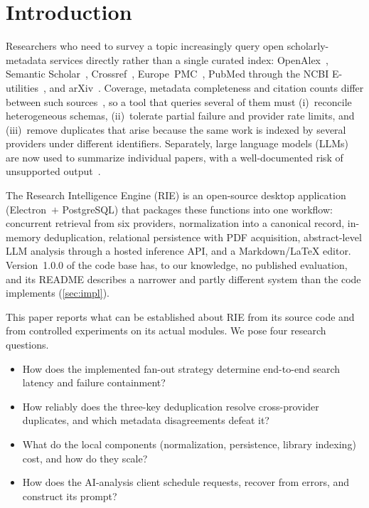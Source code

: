 \documentclass[conference]{IEEEtran}
\newcommand{\RIE}{RIE}
\begin{document}
\section{Introduction}
\label{sec:intro}

Researchers who need to survey a topic increasingly query open scholarly-metadata services directly rather than a single curated index: OpenAlex~\cite{priem2022openalex}, Semantic Scholar~\cite{lo2020s2orc,kinney2023semantic}, Crossref~\cite{hendricks2020crossref}, Europe~PMC~\cite{ferguson2021europepmc}, PubMed through the NCBI E-utilities~\cite{sayers2022eutilities}, and arXiv~\cite{arxivapi}. Coverage, metadata completeness and citation counts differ between such sources~\cite{visser2021large,gusenbauer2020which,alperin2024analysis}, so a tool that queries several of them must (i)~reconcile heterogeneous schemas, (ii)~tolerate partial failure and provider rate limits, and (iii)~remove duplicates that arise because the same work is indexed by several providers under different identifiers. Separately, large language models (LLMs) are now used to summarize individual papers, with a well-documented risk of unsupported output~\cite{ji2023survey,tang2024llmreview}.

The Research Intelligence Engine (\RIE) is an open-source desktop application (Electron~$+$ PostgreSQL) that packages these functions into one workflow: concurrent retrieval from six providers, normalization into a canonical record, in-memory deduplication, relational persistence with PDF acquisition, abstract-level LLM analysis through a hosted inference API, and a Markdown/\LaTeX{} editor. Version~1.0.0 of the code base has, to our knowledge, no published evaluation, and its README describes a narrower and partly different system than the code implements (\cref{sec:impl}).

This paper reports what can be established about \RIE{} from its source code and from controlled experiments on its actual modules. We pose four research questions.
\begin{itemize}
\item[\textbf{RQ1}] How does the implemented fan-out strategy determine end-to-end search latency and failure containment?
\item[\textbf{RQ2}] How reliably does the three-key deduplication resolve cross-provider duplicates, and which metadata disagreements defeat it?
\item[\textbf{RQ3}] What do the local components (normalization, persistence, library indexing) cost, and how do they scale?
\item[\textbf{RQ4}] How does the AI-analysis client schedule requests, recover from errors, and construct its prompt?
\end{itemize}
\end{document}
